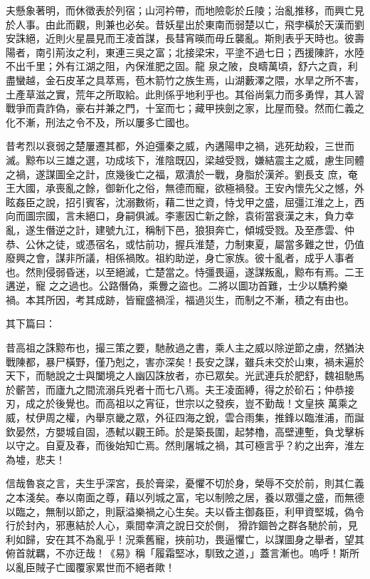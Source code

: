 \begin{pinyinscope}
 夫懸象著明，而休徵表於列宿；山河衿帶，而地險彰於丘陵；治亂推移，而興亡見於人事。由此而觀，則兼也必矣。昔妖星出於東南而弱楚以亡，飛孛橫於天漢而劉安誅絕，近則火星晨見而王凌首謀，長彗宵暎而毋丘襲亂。斯則表乎天時也。彼壽陽者，南引荊汝之利，東連三吳之富；北接梁宋，平塗不過七日；西援陳許，水陸不出千里；外有江湖之阻，內保淮肥之固。龍
 泉之陂，良疇萬頃，舒六之貢，利盡蠻越，金石皮革之具萃焉，苞木箭竹之族生焉，山湖藪澤之隈，水旱之所不害，土產草滋之實，荒年之所取給。此則係乎地利乎也。其俗尚氣力而多勇悍，其人習戰爭而貴詐偽，豪右并兼之門，十室而七；藏甲挾劍之家，比屋而發。然而仁義之化不漸，刑法之令不及，所以屢多亡國也。



 昔考烈以衰弱之楚屢遷其都，外迫彊秦之威，內遘陽申之禍，逃死劫殺，三世而滅。黥布以三雄之選，功成垓下，淮陰既囚，梁越受戮，嫌結震主之威，慮生同體之禍，遂謀圖全之計，庶幾後亡之福，眾潰於一戰，身脂於漢斧。劉長支
 庶，奄王大國，承喪亂之餘，御新化之俗，無德而寵，欲極禍發。王安內懷先父之憾，外眩姦臣之說，招引賓客，沈溺數術，藉二世之資，恃戈甲之盛，屈彊江淮之上，西向而圖宗國，言未絕口，身嗣俱滅。李憲因亡新之餘，袁術當衰漢之末，負力幸亂，遂生僭逆之計，建號九江，稱制下邑，狼狽奔亡，傾城受戮。及至彥雲、仲恭、公休之徒，或憑宿名，或怙前功，握兵淮楚，力制東夏，屬當多難之世，仍值廢興之會，謀非所議，相係禍敗。祖約助逆，身亡家族。彼十亂者，成乎人事者也。然則侵弱昏迷，以至絕滅，亡楚當之。恃彊畏逼，遂謀叛亂，黥布有焉。二王遘逆，寵
 之之過也。公路僭偽，乘釁之盜也。二將以圖功首難，士少以驕矜樂禍。本其所因，考其成跡，皆寵盛禍淫，福過災生，而制之不漸，積之有由也。



 其下篇曰：



 昔高祖之誅黥布也，撮三策之要，馳赦過之書，乘人主之威以除逆節之虜，然猶決戰陳都，暴尸橫野，僅乃剋之，害亦深矣！長安之謀，雖兵未交於山東，禍未遍於天下，而馳說之士與闔境之人幽囚誅放者，亦已眾矣。光武連兵於肥舒，魏祖馳馬於蘄苦，而廬九之間流溺兵兇者十而七八焉。夫王凌面縛，得之於砎石；仲恭接刃，成之於後覺也。而高祖以之宵征，世宗以之發疾，豈不勤哉！文皇挾
 萬乘之威，杖伊周之權，內舉京畿之眾，外征四海之銳，雲合雨集，推鋒以臨淮浦，而誕欽晏然，方嬰城自固，憑軾以觀王師。於是築長圍，起棼櫓，高壁連塹，負戈擊柝以守之。自夏及春，而後始知亡焉。然則屠城之禍，其可極言乎？約之出奔，淮左為墟，悲夫！



 信哉魯哀之言，夫生乎深宮，長於膏梁，憂懼不切於身，榮辱不交於前，則其仁義之本淺矣。奉以南面之尊，藉以列城之富，宅以制險之居，養以眾彊之盛，而無德以臨之，無制以節之，則厭溢樂禍之心生矣。夫以昏主御姦臣，利甲資堅城，偽令行於封內，邪惠結於人心，乘間幸濟之說日交於側，
 猾詐錮咎之群各馳於前，見利如歸，安在其不為亂乎！況乘舊寵，挾前功，畏逼懼亡，以謀圖身之舉者，望其俯首就羈，不亦迂哉！《易》稱「履霜堅冰，馴致之道，」蓋言漸也。嗚呼！斯所以亂臣賊子亡國覆家累世而不絕者歟！




\end{pinyinscope}
